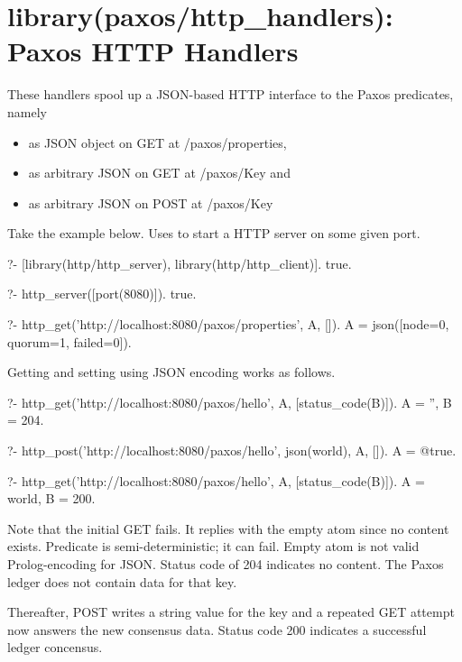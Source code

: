 \vspace{0.7cm}\chapter{library(paxos/http_handlers): Paxos HTTP Handlers}\label{sec:httphandlers}

These handlers spool up a JSON-based HTTP interface to the Paxos
predicates, namely

\begin{itemize}
    \item {} as JSON object on GET at /paxos/properties,
    \item {} as arbitrary JSON on GET at /paxos/Key and
    \item {} as arbitrary JSON on POST at /paxos/Key
\end{itemize}

Take the example below. Uses  to start a HTTP server
on some given port.

\begin{code}
?- [library(http/http_server), library(http/http_client)].
true.

?- http_server([port(8080)]).
true.

?- http_get('http://localhost:8080/paxos/properties', A, []).
A = json([node=0, quorum=1, failed=0]).
\end{code}

Getting and setting using JSON encoding works as follows.

\begin{code}
?- http_get('http://localhost:8080/paxos/hello', A, [status_code(B)]).
A = '',
B = 204.

?- http_post('http://localhost:8080/paxos/hello', json(world), A, []).
A = @true.

?- http_get('http://localhost:8080/paxos/hello', A, [status_code(B)]).
A = world,
B = 200.
\end{code}

Note that the initial GET fails. It replies with the empty atom since no
content exists. Predicate  is semi-deterministic; it can
fail. Empty atom is not valid Prolog-encoding for JSON. Status code of
204 indicates no content. The Paxos ledger does not contain data for
that key.

Thereafter, POST writes a string value for the key and a repeated GET
attempt now answers the new consensus data. Status code 200 indicates a
successful ledger concensus.

